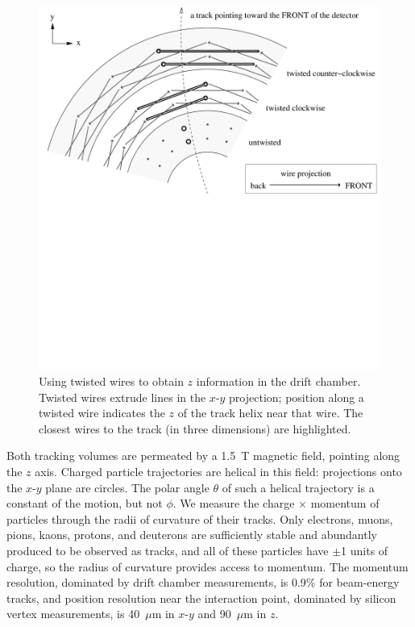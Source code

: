 \documentclass{cornell}
\begin{document}
\begin{figure}[p]
  \begin{center}
    \includegraphics[width=\linewidth, viewport=0 480 892 947]{plots/stereotwist}
  \end{center}
  \caption{\label{stereotwist} Using twisted wires to obtain $z$
  information in the drift chamber.  Twisted wires extrude lines in
  the $x$-$y$ projection; position along a twisted wire indicates the
  $z$ of the track helix near that wire.  The closest wires to the
  track (in three dimensions) are highlighted.}
\end{figure}

Both tracking volumes are permeated by a 1.5~T magnetic field,
pointing along the $z$ axis.  Charged particle trajectories are
helical in this field: projections onto the $x$-$y$ plane are circles.
The polar angle $\theta$ of such a helical trajectory is a constant of
the motion, but not $\phi$.  We measure the charge $\times$ momentum
of particles through the radii of curvature of their tracks.  Only
electrons, muons, pions, kaons, protons, and deuterons are
sufficiently stable and abundantly produced to be observed as tracks,
and all of these particles have $\pm$1 units of charge, so the radius
of curvature provides access to momentum.  The momentum resolution,
dominated by drift chamber measurements, is 0.9\% for beam-energy
tracks, and position resolution near the interaction point, dominated
by silicon vertex measurements, is 40~$\mu$m in $x$-$y$ and 90~$\mu$m
in $z$.
\end{document}
